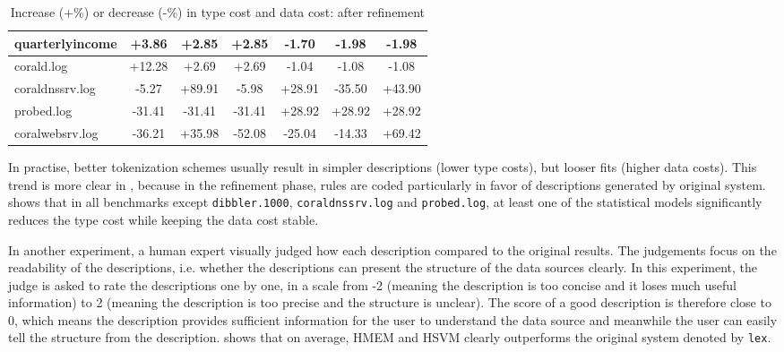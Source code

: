 {\begin{table}[th]
\begin{center}
\begin{tabular}{|l||c|c|c||c|c|c|}
quarterlyincome 	& +3.86 & +2.85 & +2.85 & -1.70 & -1.98 & -1.98    \\ \hline 
corald.log 		& +12.28 & +2.69 & +2.69 & -1.04 & -1.08 & -1.08   \\ \hline 
coraldnssrv.log  	& -5.27 & +89.91 & -5.98 & +28.91 & -35.50 & +43.90 \\ \hline
probed.log 		& -31.41 & -31.41 & -31.41 & +28.92 & +28.92 & +28.92 \\ \hline
coralwebsrv.log 	& -36.21 & +35.98 & -52.08 & -25.04 & -14.33 & +69.42 \\ \hline
\end{tabular}
\caption{Increase (+\%) or decrease (-\%) in type cost and data
cost: after refinement} \label{tab:complexity2}
\end{center}
\end{table}

In practise, better tokenization schemes usually result in simpler
descriptions (lower type costs), but looser fits (higher data
costs). This trend is more clear in , because
in the refinement phase, rules are coded particularly in favor of
descriptions generated by original \learnpads{} system.  shows that in all benchmarks except
{\tt dibbler.1000}, {\tt coraldnssrv.log} and {\tt probed.log}, at
least one of the statistical models significantly reduces the type
cost while keeping the data cost stable.
}%

In another experiment, a human expert visually judged how each
description compared to the original \learnpads{} results. The
judgements focus on the readability of the descriptions, i.e.
whether the descriptions can present the structure of the data
sources clearly. In this experiment, the judge is asked to rate the
descriptions one by one, in a scale from -2 (meaning the description is
too concise and it loses much useful information) to 2 (meaning the
description is too precise and the structure is unclear). The
score of a good description is therefore close to 0, which means the
description provides sufficient information for the user to
understand the data source and meanwhile the user can easily tell
the structure from the description.  shows that
on average, HMEM and HSVM clearly outperforms the original system
denoted by {\tt lex}.

